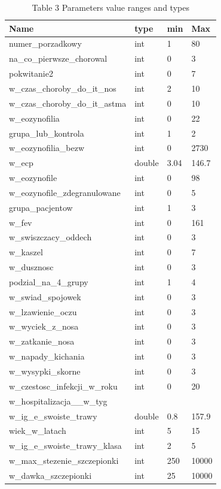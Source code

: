 \documentclass[10pt,oneside]{memoir}
\begin{document}
\begin{table}[htbp]
\begin{minipage}{\linewidth}
\setlength{\tymax}{0.5\linewidth}
\centering
\small
\caption{Table 3 Parameters value ranges and types}
\label{table3}
\begin{tabulary}{\linewidth}{@{}l@{}l@{}l@{}l@{}} \\ \toprule 
Name&type&min&Max \\\midrule
numer\_porzadkowy&int&1&80 \\
na\_co\_pierwsze\_chorowal&int&0&3 \\
pokwitanie2&int&0&7 \\
w\_czas\_choroby\_do\_it\_nos&int&2&10 \\
w\_czas\_choroby\_do\_it\_astma&int&0&10 \\
w\_eozynofilia&int&0&22 \\
grupa\_lub\_kontrola&int&1&2 \\
w\_eozynofilia\_bezw&int&0&2730 \\
w\_ecp&double&3.04&146.7 \\
w\_eozynofile&int&0&98 \\
w\_eozynofile\_zdegranulowane&int&0&5 \\
grupa\_pacjentow&int&1&3 \\
w\_fev&int&0&161 \\
w\_swiszczacy\_oddech&int&0&3 \\
w\_kaszel&int&0&7 \\
w\_dusznosc&int&0&3 \\
podzial\_na\_4\_grupy&int&1&4 \\
w\_swiad\_spojowek&int&0&3 \\
w\_lzawienie\_oczu&int&0&3 \\
w\_wyciek\_z\_nosa&int&0&3 \\
w\_zatkanie\_nosa&int&0&3 \\
w\_napady\_kichania&int&0&3 \\
w\_wysypki\_skorne&int&0&3 \\
w\_czestosc\_infekcji\_w\_roku&int&0&20 \\
w\_hospitalizacja\_\_w\_tyg&&& \\
w\_ig\_e\_swoiste\_trawy&double&0.8&157.9 \\
wiek\_w\_latach&int&5&15 \\
w\_ig\_e\_swoiste\_trawy\_klasa&int&2&5 \\
w\_max\_stezenie\_szczepionki&int&250&10000 \\
w\_dawka\_szczepionki&int&25&10000 \\

\end{tabulary}
\end{minipage}
\end{table}
\end{document}
